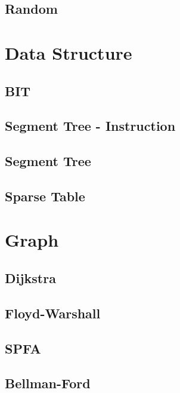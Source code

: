\documentclass[twocolumn]{article}
\begin{document}
\subsection{Random}


\section{Data Structure}

\subsection{BIT}


\subsection{Segment Tree - Instruction}


\subsection{Segment Tree}


\subsection{Sparse Table}


\section{Graph}

\subsection{Dijkstra}


\subsection{Floyd-Warshall}


\subsection{SPFA}


\subsection{Bellman-Ford}

\end{document}
